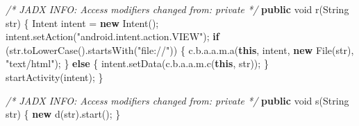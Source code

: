 \documentclass[
]{article}
\newenvironment{Shaded}{}{}
\newcommand{\BuiltInTok}[1]{\textcolor[rgb]{0.00,0.50,0.00}{#1}}
\newcommand{\CommentTok}[1]{\textcolor[rgb]{0.38,0.63,0.69}{\textit{#1}}}
\newcommand{\ControlFlowTok}[1]{\textcolor[rgb]{0.00,0.44,0.13}{\textbf{#1}}}
\newcommand{\DataTypeTok}[1]{\textcolor[rgb]{0.56,0.13,0.00}{#1}}
\newcommand{\FunctionTok}[1]{\textcolor[rgb]{0.02,0.16,0.49}{#1}}
\newcommand{\KeywordTok}[1]{\textcolor[rgb]{0.00,0.44,0.13}{\textbf{#1}}}
\newcommand{\NormalTok}[1]{#1}
\newcommand{\OperatorTok}[1]{\textcolor[rgb]{0.40,0.40,0.40}{#1}}
\newcommand{\StringTok}[1]{\textcolor[rgb]{0.25,0.44,0.63}{#1}}
\begin{document}
\begin{Shaded}
\begin{Highlighting}[]
    \CommentTok{/* JADX INFO: Access modifiers changed from: private */}
    \KeywordTok{public} \DataTypeTok{void} \FunctionTok{r}\OperatorTok{(}\BuiltInTok{String}\NormalTok{ str}\OperatorTok{)} \OperatorTok{\{}
\NormalTok{        Intent intent }\OperatorTok{=} \KeywordTok{new} \FunctionTok{Intent}\OperatorTok{();}
\NormalTok{        intent}\OperatorTok{.}\FunctionTok{setAction}\OperatorTok{(}\StringTok{"android.intent.action.VIEW"}\OperatorTok{);}
        \ControlFlowTok{if} \OperatorTok{(}\NormalTok{str}\OperatorTok{.}\FunctionTok{toLowerCase}\OperatorTok{().}\FunctionTok{startsWith}\OperatorTok{(}\StringTok{"file://"}\OperatorTok{))} \OperatorTok{\{}
\NormalTok{            c}\OperatorTok{.}\FunctionTok{b}\OperatorTok{.}\FunctionTok{a}\OperatorTok{.}\FunctionTok{a}\OperatorTok{.}\FunctionTok{m}\OperatorTok{.}\FunctionTok{a}\OperatorTok{(}\KeywordTok{this}\OperatorTok{,}\NormalTok{ intent}\OperatorTok{,} \KeywordTok{new} \BuiltInTok{File}\OperatorTok{(}\NormalTok{str}\OperatorTok{),} \StringTok{"text/html"}\OperatorTok{);}
        \OperatorTok{\}} \ControlFlowTok{else} \OperatorTok{\{}
\NormalTok{            intent}\OperatorTok{.}\FunctionTok{setData}\OperatorTok{(}\NormalTok{c}\OperatorTok{.}\FunctionTok{b}\OperatorTok{.}\FunctionTok{a}\OperatorTok{.}\FunctionTok{a}\OperatorTok{.}\FunctionTok{m}\OperatorTok{.}\FunctionTok{c}\OperatorTok{(}\KeywordTok{this}\OperatorTok{,}\NormalTok{ str}\OperatorTok{));}
        \OperatorTok{\}}
        \FunctionTok{startActivity}\OperatorTok{(}\NormalTok{intent}\OperatorTok{);}
    \OperatorTok{\}}

    \CommentTok{/* JADX INFO: Access modifiers changed from: private */}
    \KeywordTok{public} \DataTypeTok{void} \FunctionTok{s}\OperatorTok{(}\BuiltInTok{String}\NormalTok{ str}\OperatorTok{)} \OperatorTok{\{}
        \KeywordTok{new} \FunctionTok{d}\OperatorTok{(}\NormalTok{str}\OperatorTok{).}\FunctionTok{start}\OperatorTok{();}
    \OperatorTok{\}}


\end{Highlighting}
\end{Shaded}
\end{document}
